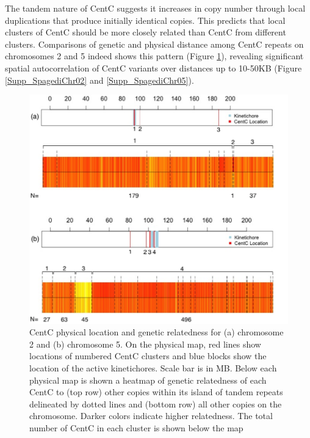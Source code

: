 The tandem nature of CentC suggests it increases in copy number through local duplications that produce initially identical copies.  This predicts that local clusters of CentC should be more closely related than CentC from different clusters.  Comparisons of genetic and physical distance among CentC repeats on chromosomes 2 and 5 indeed shows this pattern (Figure \ref{heatmap}), revealing significant spatial autocorrelation of CentC variants over distances up to 10-50KB (Figure \ref{Supp_SpagediChr02} and \ref{Supp_SpagediChr05}).

\begin{figure}[h]
\centering
\includegraphics[width=1\textwidth]{Fig3_Heatmap}
\caption{CentC physical location and genetic relatedness for (a) chromosome 2 and (b) chromosome 5.  On the physical map, red lines show locations of numbered CentC clusters and blue blocks show the location of the active kinetichores.  Scale bar is in MB.  Below each physical map is shown a heatmap of genetic relatedness of each CentC to (top row) other copies within its island of tandem repeats delineated by dotted lines and (bottom row) all other copies on the chromosome.  Darker colors indicate higher relatedness.  The total number of CentC in each cluster is shown below the map
}
\label{heatmap}    
\end{figure}

